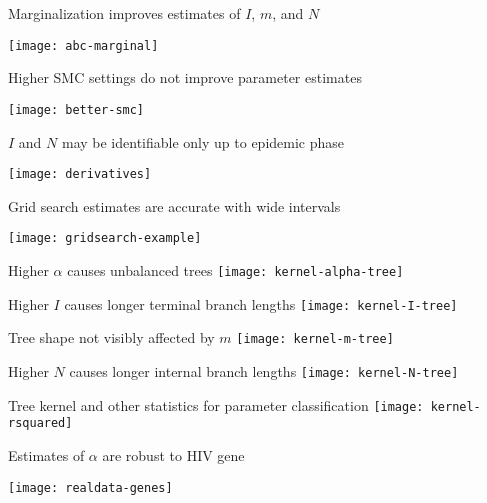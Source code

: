\begin{frame}{Marginalization improves estimates of $I$, $m$, and $N$}
  \centerline{\texttt{[image: abc-marginal]}}
\end{frame}

\begin{frame}{Higher SMC settings do not improve parameter estimates}
  \centerline{\texttt{[image: better-smc]}}
\end{frame}

\begin{frame}{$I$ and $N$ may be identifiable only up to epidemic phase}
  \centerline{\texttt{[image: derivatives]}}
\end{frame}

\begin{frame}{Grid search estimates are accurate with wide intervals}
  \centerline{\texttt{[image: gridsearch-example]}}
\end{frame}

\begin{frame}{Higher $\alpha$ causes unbalanced trees}
  \texttt{[image: kernel-alpha-tree]}
\end{frame}

\begin{frame}{Higher $I$ causes longer terminal branch lengths}
  \texttt{[image: kernel-I-tree]}
\end{frame}

\begin{frame}{Tree shape not visibly affected by $m$}
  \texttt{[image: kernel-m-tree]}
\end{frame}

\begin{frame}{Higher $N$ causes longer internal branch lengths}
  \texttt{[image: kernel-N-tree]}
\end{frame}

\begin{frame}{Tree kernel and other statistics for parameter classification}
  \texttt{[image: kernel-rsquared]}
\end{frame}

\begin{frame}{Estimates of $\alpha$ are robust to HIV gene}
  \centerline{\texttt{[image: realdata-genes]}}
\end{frame}

